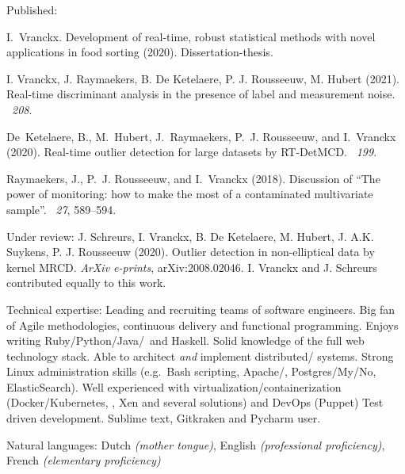 \documentclass[10pt,a4paper]{article}
\begin{document}
\inlineheadsection  %
{Published:}
{
	I.~Vranckx. Development of real-time, robust statistical methods with novel applications in food sorting (2020). Dissertation-thesis.
	
	\hangindent=3.5mm
	I. Vranckx, J. Raymaekers, B. De Ketelaere, P. J. Rousseeuw, M. Hubert (2021).
	\newblock Real-time discriminant analysis in the presence of label and measurement noise.
	~{\em 208}.
	
	De~Ketelaere, B., M.~Hubert, J.~Raymaekers, P.~J. Rousseeuw, and I.~Vranckx	(2020).
	\newblock Real-time outlier detection for large datasets by {RT-DetMCD}.
	~{\em 199}. 
		
	Raymaekers, J., P.~J. Rousseeuw, and I.~Vranckx (2018).
	\newblock Discussion of ``{T}he power of monitoring: how to make the most of a contaminated multivariate sample''.
	~{\em 27}, 589--594. 
}
\vspace{0.5em}
\inlineheadsection
{Under review:}
{J. Schreurs, I. Vranckx, B. De Ketelaere, M. Hubert, J. A.K. Suykens, P. J. Rousseeuw (2020). Outlier detection in non-elliptical data by kernel MRCD. \textit{ArXiv e-prints}, arXiv:2008.02046. I. Vranckx and J. Schreurs contributed equally to this work.}

\spacedhrule{1.6em}{-0.4em}


\inlineheadsection  %
{Technical expertise:}
{Leading and recruiting teams of software engineers.  Big fan of Agile methodologies, continuous delivery and functional programming.  Enjoys writing Ruby/\nsp Python/\nsp Java/\nsp \CPP~and Haskell.  Solid knowledge of the full web technology stack.  Able to architect \textit{and} implement distributed/ systems.  Strong Linux administration skills (e.g.\ Bash scripting, Apache/, Postgres/My/No, ElasticSearch).  Well experienced with virtualization/containerization (Docker/Kubernetes, , Xen and several  solutions) and DevOps (Puppet) Test driven development. Sublime text, Gitkraken and Pycharm user.}

\vspace{0.5em}
\inlineheadsection
{Natural languages:}
{Dutch \emph{(mother tongue)}, English \emph{(professional proficiency)}, French \emph{(elementary proficiency)}}
\end{document}
